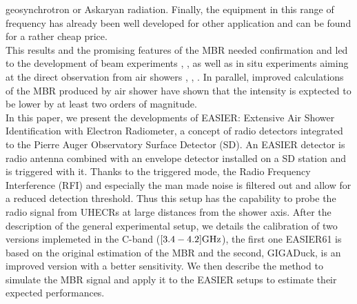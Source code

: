 geosynchrotron or Askaryan radiation. Finally, the equipment in this range of frequency has already been well developed for other application and can be found for a rather cheap price.\\ This results and the promising features  of  the MBR needed confirmation and led  to  the  development of  beam  experiments \cite{amy}, \cite{maybe}, as well as in situ experiments aiming at the direct  observation  from   air  showers  \cite{midas},  \cite{crome}, \cite{amber}.  In parallel, improved  calculations of the MBR produced by  air  shower  \cite{imen2016}  have  shown that  the  intensity  is exptected to  be lower by at  least two orders of  magnitude.\\ In this
paper, we  present the developments  of EASIER: Extensive Air Shower Identification with Electron Radiometer, a concept of radio detectors  integrated to the Pierre Auger Observatory  Surface Detector (SD). An EASIER detector is radio antenna combined with an envelope detector  installed on a SD station and is triggered with it. Thanks to the triggered mode, the Radio Frequency Interference (RFI)  and especially the man made noise is filtered out and allow for a reduced detection threshold. Thus this setup has the capability to probe the radio signal from UHECRs at large distances from the shower axis.  After the description of the general experimental setup, we details the calibration of two versions implemeted in the C-band ($\rm [3.4 - 4.2] GHz$), the first one EASIER61 is based on the original  estimation of the MBR and the second, GIGADuck, is an improved version with a better sensitivity. We then describe the  method to simulate  the MBR signal and apply it to the EASIER setups to estimate their expected performances.


